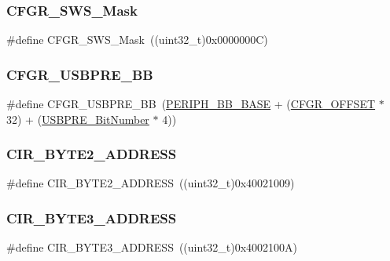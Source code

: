 \subsubsection{\texorpdfstring{CFGR\_SWS\_Mask}{CFGR\_SWS\_Mask}}
{\footnotesize\ttfamily \#define C\+F\+G\+R\+\_\+\+S\+W\+S\+\_\+\+Mask~((uint32\+\_\+t)0x0000000\+C)}

\mbox{\label{group___r_c_c___private___defines_gabde4e60349b8412a79611c0aeb27c3a2}} 
\subsubsection{\texorpdfstring{CFGR\_USBPRE\_BB}{CFGR\_USBPRE\_BB}}
{\footnotesize\ttfamily \#define C\+F\+G\+R\+\_\+\+U\+S\+B\+P\+R\+E\+\_\+\+BB~(\mbox{\hyperlink{group___peripheral__memory__map_gaed7efc100877000845c236ccdc9e144a}{P\+E\+R\+I\+P\+H\+\_\+\+B\+B\+\_\+\+B\+A\+SE}} + (\mbox{\hyperlink{group___r_c_c___private___defines_ga8682298330c3b9bae1992e4f1a0af985}{C\+F\+G\+R\+\_\+\+O\+F\+F\+S\+ET}} $\ast$ 32) + (\mbox{\hyperlink{group___r_c_c___private___defines_gad758d602b6d2b93a04cb8ada87c20c82}{U\+S\+B\+P\+R\+E\+\_\+\+Bit\+Number}} $\ast$ 4))}

\mbox{\label{group___r_c_c___private___defines_gaab58c3f3f81bf1ab9a14cf3fececd8c4}} 
\subsubsection{\texorpdfstring{CIR\_BYTE2\_ADDRESS}{CIR\_BYTE2\_ADDRESS}}
{\footnotesize\ttfamily \#define C\+I\+R\+\_\+\+B\+Y\+T\+E2\+\_\+\+A\+D\+D\+R\+E\+SS~((uint32\+\_\+t)0x40021009)}

\mbox{\label{group___r_c_c___private___defines_ga43f47430582c9575970901533e525bb5}} 
\subsubsection{\texorpdfstring{CIR\_BYTE3\_ADDRESS}{CIR\_BYTE3\_ADDRESS}}
{\footnotesize\ttfamily \#define C\+I\+R\+\_\+\+B\+Y\+T\+E3\+\_\+\+A\+D\+D\+R\+E\+SS~((uint32\+\_\+t)0x4002100\+A)}

